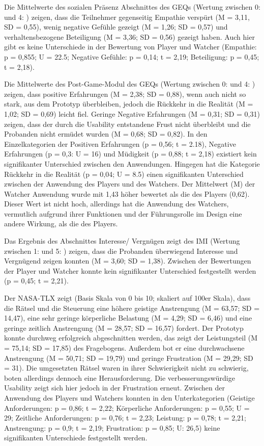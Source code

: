 Die Mittelwerte des sozialen Präsenz Abschnittes des \ac{GEQ}s (Wertung zwischen 0:  und 4: ) zeigen, dass die Teilnehmer gegenseitig Empathie verspürt (M = 3,11, SD = 0,55), wenig negative Gefühle gezeigt (M = 1,26; SD = 0,57) und verhaltensbezogene Beteiligung (M = 3,36; SD = 0,56) gezeigt haben. Auch hier gibt es keine Unterschiede in der Bewertung von Player und Watcher (Empathie: p = 0,855; U = 22.5; Negative Gefühle: p = 0,14; t = 2,19; Beteiligung: p = 0,45; t = 2,18).

Die Mittelwerte des Post-Game-Modul des \ac{GEQ}s (Wertung zwischen 0:  und 4: ) zeigen, dass positive Erfahrungen (M = 2,38; SD = 0,88), wenn auch nicht so stark, aus dem Prototyp überbleiben, jedoch die Rückkehr in die Realität (M = 1,02; SD = 0,69) leicht fiel. Geringe Negative Erfahrungen (M = 0,31; SD = 0,31) zeigen, dass der durch die Usability entstandene Frust nicht überbleibt und die Probanden nicht ermüdet wurden (M = 0,68; SD = 0,82). In den Einzelkategorien der Positiven Erfahrungen (p = 0,56; t = 2.18), Negative Erfahrungen (p = 0,3: U = 16) und Müdigkeit (p = 0,88; t = 2,18) existiert kein signifikanter Unterschied zwischen den Anwendungen. Hingegen hat die Kategorie Rückkehr in die Realität (p = 0,04; U = 8.5) einen signifikanten Unterschied zwischen der Anwendung des Players und des Watchers. Der Mittelwert (M) der Watcher Anwendung wurde mit 1,43 höher bewertet als die des Players (0,62). Dieser Wert ist nicht hoch, allerdings hat die Anwendung des Watchers, vermutlich aufgrund ihrer Funktionen und der Führungsrolle im Design eine andere Wirkung, als die des Players.

Das Ergebnis des Abschnittes Interesse/ Vergnügen zeigt des \ac{IMI} (Wertung zwischen 1:  und 5: ) zeigen, dass die Probanden überwiegend Interesse und Vergnügend zeigen konnten (M = 3,60; SD = 1,38). Zwischen der Bewertungen der Player und Watcher konnte kein signifikanter Unterschied festgestellt werden (p = 0,45; t = 2,21). 

Der \ac{NASA-TLX} zeigt (Basis Skala von 0 bis 10; skaliert auf 100er Skala), dass die Rätsel und die Steuerung eine höhere geistige Anstrengung (M = 63,57; SD = 14,47), eine sehr geringe körperliche Belastung (M = 4,29; SD = 6,46) und eine geringe zeitlich Anstrengung (M = 28,57; SD = 16,57) fordert. 
Der Prototyp konnte durchweg erfolgreich abgeschnitten werden, das zeigt der Leistungsteil (M = 75,14; SD = 17,85) des Fragebogens. Außerdem bot er eine durchwachsene Anstrengung (M = 50,71; SD = 19,79) und geringe Frustration (M = 29,29; SD = 31). Die umgesetzten Rätsel waren in ihrer Schwierigkeit nicht zu schwierig, boten allerdings dennoch eine Herausforderung. Die verbesserungswürdige Usability zeigt sich hier jedoch in der Frustration erneut. Zwischen der Anwendung des Players und Watchers konnten in den Unterkategorien (Geistige Anforderungen: p = 0,86; t = 2,22; Körperliche Anforderungen: p = 0,55; U = 29; Zeitliche Anforderungen: p = 0,76; t = 2,23; Leistung: p = 0,78; t = 2,21; Anstrengung: p = 0,9; t = 2,19; Frustration: p = 0,85; U: 26,5) keine signifikanten Unterschiede festgestellt werden.


